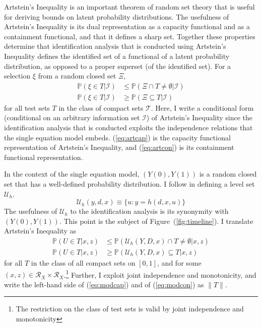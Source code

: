 \documentclass[12pt,a4paper,twoside]{article}
\numberwithin{equation}{section}
\newcommand{\Art}{Artstein's Inequality}
\begin{document}
{\Art} \citep{aR83} is an important theorem of random set theory that is useful for deriving bounds on latent probability distributions. The usefulness of {\Art} is its dual representation as a capacity functional and as a containment functional, and that it defines a sharp set. Together these properties determine that identification analysis that is conducted using {\Art} defines the identified set of a functional of a latent probability distribution, as opposed to a proper superset (of the identified set). For a selection $\xi$ from a random closed set $\Xi$,
\begin{align}
\mathbb{P}(\xi\in T|\mathcal{I})&\leq\mathbb{P}(\Xi\cap T\neq\emptyset|\mathcal{I})\label{eq:artcap}\\
\mathbb{P}(\xi\in T|\mathcal{I})&\geq\mathbb{P}(\Xi\subseteq T|\mathcal{I})\label{eq:artcon}
\end{align}
for all test sets $T$ in the class of compact sets $\mathcal{T}$. Here, I write a conditional form (conditional on an arbitrary information set $\mathcal{I}$) of {\Art} since the identification analysis that is conducted exploits the independence relations that the single equation model embeds. (\ref{eq:artcap}) is the capacity functional representation of {\Art}, and (\ref{eq:artcon}) is its containment functional representation. 

In the context of the single equation model, $(Y(0),Y(1))$ is a random closed set that has a well-defined probability distribution. I follow \cite{cr13} in defining a level set $\mathcal{U}_h$.
\[\mathcal{U}_h(y,d,x)\equiv\lbrace u : y=h(d,x,u)\rbrace\] 
The usefulness of $\mathcal{U}_h$ to the identification analysis is its synonymity with $(Y(0),Y(1))$. This point is the subject of Figure~(\ref{fig:timeline}). I translate {\Art} as 
\begin{align}
\mathbb{P}(U\in T|x,z)&\leq\mathbb{P}(\mathcal{U}_h(Y,D,x)\cap T\neq\emptyset|x,z)\label{eq:modcap}\\
\mathbb{P}(U\in T|x,z)&\geq\mathbb{P}(\mathcal{U}_h(Y,D,x)\subseteq T|x,z)\label{eq:modcon}
\end{align}
for all $T$ in the class of all compact sets on $[0,1]$, and for some $(x,z)\in\mathcal{R}_X\times\mathcal{R}_X$.\footnote{The restriction on the class of test sets is valid by joint independence and monotonicity} Further, I exploit joint independence and monotonicity, and write the left-hand side of (\ref{eq:modcap}) and of (\ref{eq:modcon}) as $\| T\|$. 
\end{document}
